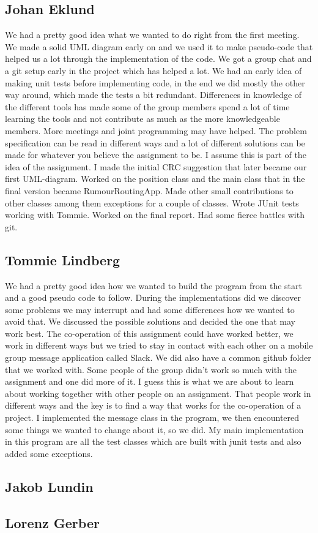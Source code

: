 \documentclass[a4paper,11pt,twoside]{article}
\begin{document}
\subsection{Johan Eklund}
We had a pretty good idea what we wanted to do right from the first
meeting. We made a solid UML diagram early on and we used it to make
pseudo-code that helped us a lot through the implementation of the
code.
We got a group chat and a git setup early in the project which has
helped a lot.
We had an early idea of making unit tests before implementing code, in
the end we did mostly the other way around, which made the tests a bit
redundant.
Differences in knowledge of the different tools has made some of the
group members spend a lot of time learning the tools and not
contribute as much as the more knowledgeable members. More meetings
and joint programming may have helped.
The problem specification can be read in different ways and a lot of
different solutions can be made for whatever you believe the
assignment to be. I assume this is part of the idea of the assignment.
I made the initial CRC suggestion that later became our first
UML-diagram. Worked on the position class and the main class that in
the final version became RumourRoutingApp. Made other small
contributions to other classes among them exceptions for a couple of
classes. Wrote JUnit tests working with Tommie. Worked on the final
report. Had some fierce battles with git.

\subsection{Tommie Lindberg}
We had a pretty good idea how we wanted to build the program from the
start and a good pseudo code to follow. During the implementations did
we discover some problems we may interrupt and had some differences how
we wanted to avoid that. We discussed the possible solutions and
decided the one that may work best. 
The co-operation of this assignment could have worked better, we work
in different ways but we tried to stay in contact with each other on a
mobile group message application called Slack. We did also have a
common github folder that we worked with. Some people of the group
didn't work so much with the assignment and one did more of it. I
guess this is what we are about to learn about working together with
other people on an assignment. That people work in different ways and
the key is to find a way that works for the co-operation of a project.
I implemented the message class in the program, we then encountered
some things we wanted to change about it, so we did. My main
implementation in this program are all the test classes which are
built with junit tests and also added some exceptions.

\subsection{Jakob Lundin}

\subsection{Lorenz Gerber}


\end{document}
